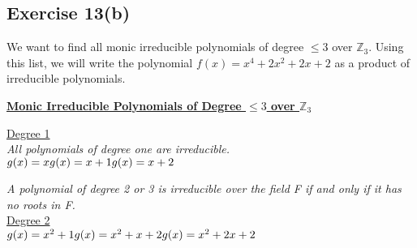 \subsection*{Exercise 13(b)}
We want to find all monic irreducible polynomials of degree $\le 3$ over $\mathbb{Z}_3$. Using this list, we will write the polynomial $f(x) = x^4 + 2x^2 + 2x + 2$ as a product of irreducible polynomials.
\vspace{5mm}

\underline{\textbf{Monic Irreducible Polynomials of Degree $\le 3$ over $\mathbb{Z}_3$}}

\underline{Degree 1} \\
\textit{All polynomials of degree one are irreducible.} \\
$g(x) = x \\
g(x) = x + 1 \\
g(x) = x + 2$

\textit{A polynomial of degree 2 or 3 is irreducible over the field F if and only if it has no roots in F.} \\
\underline{Degree 2} \\
$%
g(x) = x^2 + 1 \\
g(x) = x^2 + x + 2 \\
g(x) = x^2 + 2x + 2$

